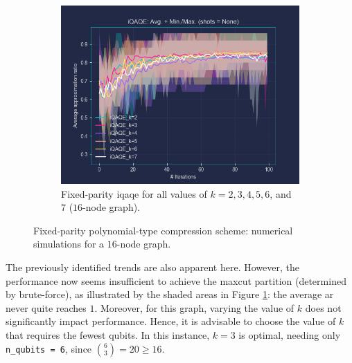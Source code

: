 \clearpage

\begin{figure}[ht!]
  \addtocounter{figure}{-1} %
  \centering
  \begin{subfigure}[b]{\textwidth}
      \addtocounter{subfigure}{2} %
      \centering
      \includegraphics[width=1\textwidth]{Figures/Chapter_5/Fixed-parity/All_k's(16-node).png}
      \caption{Fixed-parity \acrshort{iqaqe} for all values of $k = 2, 3, 4, 5, 6$, and $7$ ($16$-node graph).}
      \label{fig:All_k's(16_node)}
  \end{subfigure}
  \caption{Fixed-parity polynomial-type compression scheme: numerical simulations for a $16$-node graph.}
  \label{fig:Fixed-parity(16_node)}
\end{figure}

The previously identified trends are also apparent here. However, the performance now seems insufficient to achieve the \acrshort{maxcut} partition (determined by brute-force), as illustrated by the shaded areas in Figure \ref{fig:All_k's(16_node)}: the average \acrshort{ar} never quite reaches $1$. Moreover, for this graph, varying the value of $k$ does not significantly impact performance. Hence, it is advisable to choose the value of $k$ that requires the fewest qubits. In this instance, $k=3$ is optimal, needing only \texttt{n\_qubits = 6}, since $\binom{6}{3} = 20 \geq 16$.


